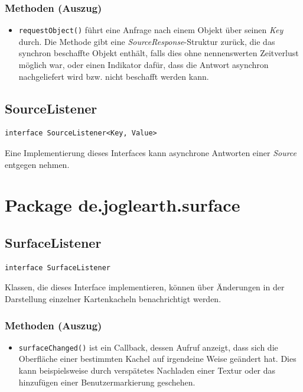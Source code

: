 \documentclass[10pt]{scrreprt}
\begin{document}
\subsubsection*{Methoden (Auszug)}
\begin{itemize}
\item \texttt{requestObject()} führt eine Anfrage nach einem Objekt über seinen \textit{Key} durch. Die Methode gibt eine \textit{SourceResponse}-Struktur zurück, die das synchron beschaffte Objekt enthält, falls dies ohne nennenswerten Zeitverlust möglich war, oder einen Indikator dafür, dass die Antwort asynchron nachgeliefert wird bzw. nicht beschafft werden kann.
\end{itemize}

\vspace{5mm}
\subsection*{SourceListener}
\begin{lstlisting}
interface SourceListener<Key, Value>
\end{lstlisting}
Eine Implementierung dieses Interfaces kann asynchrone Antworten einer \textit{Source} entgegen nehmen.\\

\pagebreak
\section{Package de.joglearth.surface}
\subsection*{SurfaceListener}
\begin{lstlisting}
interface SurfaceListener
\end{lstlisting}
Klassen, die dieses Interface implementieren, können über Änderungen in der Darstellung einzelner Kartenkacheln benachrichtigt werden.\\
\subsubsection*{Methoden (Auszug)}
\begin{itemize}
\item \texttt{surfaceChanged()} ist ein Callback, dessen Aufruf anzeigt, dass sich die Oberfläche einer bestimmten Kachel auf irgendeine Weise geändert hat. Dies kann beispielsweise durch verspätetes Nachladen einer Textur oder das hinzufügen einer Benutzermarkierung geschehen.
\end{itemize}
\end{document}
